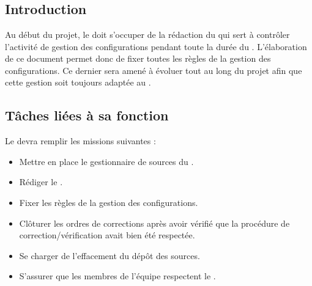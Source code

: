 \newpage
\section{\RGC}
\subsection*{Introduction}

Au début du projet, le \RGC{} doit s'occuper de la rédaction du \PGCCourt{} qui sert à contrôler l’activité de gestion des configurations pendant toute la durée du \PICCourt. L’élaboration de ce document permet donc de fixer toutes les règles de la gestion des configurations. Ce dernier sera amené à évoluer tout au long du projet afin que cette gestion soit toujours adaptée au \PICCourt.

\subsection*{Tâches liées à sa fonction}

Le \RGC{} devra remplir les missions suivantes :
\begin{itemize}
	\item Mettre en place le gestionnaire de sources du \PICCourt.
	\item Rédiger le \PGC.
	\item Fixer les règles de la gestion des configurations.
        \item Clôturer les ordres de corrections après avoir vérifié que la procédure de correction/vérification avait bien été respectée.
        \item Se charger de l'effacement du dépôt des sources.
        \item S'assurer que les membres de l'équipe \PICCourt{} respectent le \PGCCourt.
\end{itemize}
